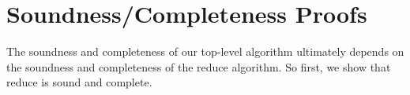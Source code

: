 \documentclass[10pt,a4paper]{article}
\newcommand{\rp}[2]{\ensuremath{\langle #1, #2 \rangle}}
\newcommand{\res}[2]{\ensuremath{r_{#1}^{#2}}}
\begin{document}

\section{Soundness/Completeness Proofs}

The soundness and completeness of our top-level algorithm ultimately depends on the soundness and completeness of the reduce algorithm. So first, we show that reduce is sound and complete.
\end{document}

